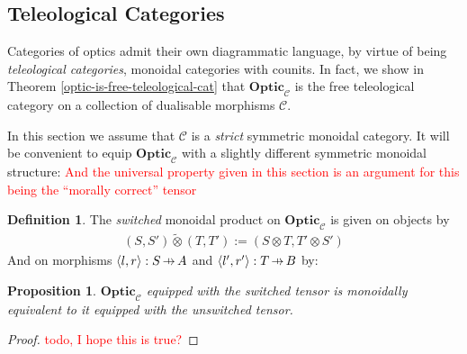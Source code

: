 \documentclass[11pt,a4paper]{article}
\theoremstyle{plain}
\newtheorem{proposition}[theorem]{Proposition}
\theoremstyle{definition}
\newtheorem{definition}[theorem]{Definition}
\newcommand{\C}{\mathscr{C}}
\newcommand{\Optic}{\mathbf{Optic}}
\newcommand{\switched}{\mathbin{\tilde{\otimes}}}
\newcommand{\hto}{\ensuremath{\,\mathaccent\shortmid\rightarrow\,}}
\newcommand{\todo}[1]{\textcolor{red}{\small #1}}
\begin{document}
\subsection{Teleological Categories}
\label{teleological-categories}

Categories of optics admit their own diagrammatic language, by virtue of being \emph{teleological categories}, monoidal categories with counits. In fact, we show in Theorem \ref{optic-is-free-teleological-cat} that $\Optic_\C$ is the free teleological category on a collection of dualisable morphisms $\C$.

In this section we assume that $\C$ is a \emph{strict} symmetric monoidal category. It will be convenient to equip $\Optic_\C$ with a slightly different symmetric monoidal structure: \todo{And the universal property given in this section is an argument for this being the ``morally correct'' tensor}

\begin{definition}
The \emph{switched} monoidal product on $\Optic_\C$ is given on objects by 
\begin{align*}
(S, S') \switched (T, T') := (S \otimes T, T' \otimes S')
\end{align*}
And on morphisms $\langle l, r \rangle : S \hto A$ and $\langle l', r' \rangle : T \hto B$ by:
\begin{center}

\end{center}
\end{definition}

\begin{proposition}
$\Optic_\C$ equipped with the switched tensor is monoidally equivalent to it equipped with the unswitched tensor.
\end{proposition}
\begin{proof}
\todo{todo, I hope this is true?}
\end{proof}
\end{document}
